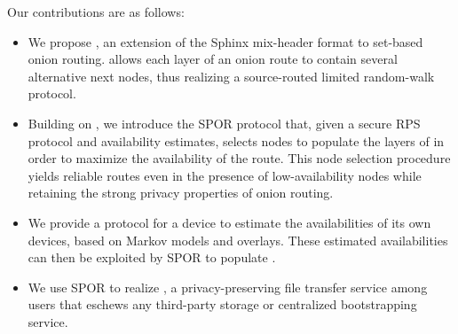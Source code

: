 Our contributions are as follows: 
\begin{itemize}


  \item We propose \Sphinxes, an extension of the
    \ac{Sphinx} mix-header format to set-based onion routing. \Sphinxes allows each layer of an onion route to contain several alternative next nodes, thus realizing a source-routed limited random-walk protocol.

  \item Building on \Sphinxes, we introduce the \ac{SPOR} %
    protocol
    that, given a secure 
    \ac{RPS} protocol and availability estimates, selects nodes to populate the 
    layers of \Sphinxes in order to maximize the availability of the route. This node selection procedure 
    yields reliable routes even in the presence of low-availability nodes while retaining the strong privacy properties of onion routing.

  \item We provide a protocol for a device \squad to estimate the availabilities 
    of its own devices, based on Markov models and \squad overlays.
    These estimated availabilities can then be exploited by \ac{SPOR} to populate \Sphinxes.

  \item We use \ac{SPOR} to realize \name,  a privacy-preserving file transfer service among
  users that eschews any third-party storage or centralized bootstrapping service.

\end{itemize}


